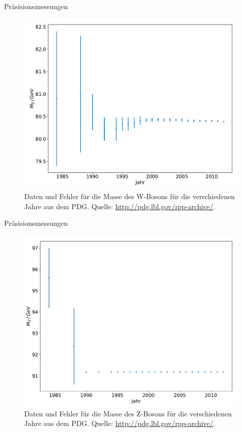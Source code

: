 \documentclass[aspectratio=1610, professionalfonts, 10pt]{beamer}
\begin{document}
\begin{frame}{Präsisionsmessungen}
		\begin{figure}
	  		\centering
			\includegraphics[width=0.9\textheight]{ressources/mw.pdf}
			\caption{Daten und Fehler für die Masse des W-Bosons für die verschiedenen Jahre aus dem PDG. Quelle: \url{http://pdg.lbl.gov/rpp-archive/}.}
	  		\label{fig:sad}
		\end{figure}
\end{frame}

\begin{frame}{Präsisionsmessungen}
		\begin{figure}
	  		\centering
			\includegraphics[width=0.9\textheight]{ressources/mz.pdf}
			\caption{Daten und Fehler für die Masse des Z-Bosons für die verschiedenen Jahre aus dem PDG. Quelle: \url{http://pdg.lbl.gov/rpp-archive/}.}
	  		\label{fig:sad}
		\end{figure}
\end{frame}
\end{document}

